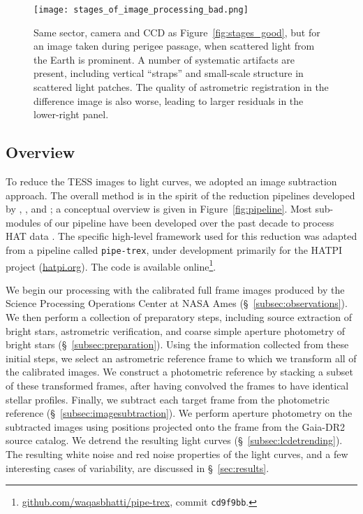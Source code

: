 \documentclass[12pt,twocolumn,tighten]{aastex62}
\begin{document}
\begin{figure}[!t]
    \begin{center}
        \leavevmode
        \texttt{[image: stages\_of\_image\_processing\_bad.png]}
    \end{center}
    \vspace{-0.6cm}
    \caption{
        Same sector, camera and CCD as Figure~\ref{fig:stages_good}, but for an image taken during
        perigee passage, when scattered light from the Earth is
        prominent.
        A number of systematic artifacts are present,
        including vertical ``straps'' and small-scale structure in scattered light
        patches.
        The quality of astrometric registration in the difference image is also
        worse, leading to larger residuals in the lower-right panel.
        \label{fig:stages_bad}
    }
\end{figure}

\subsection{Overview}

To reduce the TESS images to light curves, we adopted an image
subtraction approach.  The overall method is in the spirit of the
reduction pipelines developed by \citet{Pal_2009},
\citet{huang_high-precision_2015}, \citet{soares-furtado_image_2017}
and \citet{oelkers_precision_2018}; a conceptual overview is given in
Figure~\ref{fig:pipeline}.  Most sub-modules of our pipeline have been
developed over the past decade to process HAT data \citep[{\it
e.g.},][]{bakos_hat_review_2018}.  The specific high-level framework
used for this reduction was adapted from a pipeline called
\texttt{pipe-trex}, under development primarily for the HATPI project
(\url{hatpi.org}).  The code is available
online\footnote{\url{github.com/waqasbhatti/pipe-trex}, commit
\texttt{cd9f9bb}.}.

We begin our processing with the calibrated full frame images produced
by the Science Processing Operations Center at NASA Ames
(\S~\ref{subsec:observations}).  We then perform a collection of
preparatory steps, including source extraction of bright stars,
astrometric verification, and coarse simple aperture photometry of
bright stars (\S~\ref{subsec:preparation}).  Using the information
collected from these initial steps, we select an astrometric reference
frame to which we transform all of the calibrated images.  We
construct a photometric reference by stacking a subset of these
transformed frames, after having convolved the frames to have
identical stellar profiles. Finally, we subtract each target frame
from the photometric reference (\S~\ref{subsec:imagesubtraction}).  We
perform aperture photometry on the subtracted images using positions
projected onto the frame from the Gaia-DR2 source catalog.  We detrend
the resulting light curves (\S~\ref{subsec:lcdetrending}).  The
resulting white noise and red noise properties of the light curves,
and a few interesting cases of variability, are discussed in
\S~\ref{sec:results}.
\end{document}
